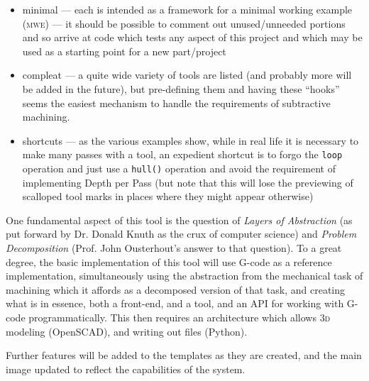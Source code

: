 \documentclass{ltxdoc}
\begin{document}
\begin{itemize}
\item minimal --- each is intended as a framework for a minimal working example (\textsc{mwe}) --- it should be possible to comment out unused/unneeded portions and so arrive at code which tests any aspect of this project and which may be used as a starting point for a new part/project
\item compleat --- a quite wide variety of tools are listed (and probably more will be added in the future), but pre-defining them and having these ``hooks'' seems the easiest mechanism to handle the requirements of subtractive machining. 
\item shortcuts --- as the various examples show, while in real life it is necessary to 
                    make many passes with a tool, an expedient shortcut is to forgo the 
                    \verb|loop| operation and just use a \verb|hull()| operation and avoid the requirement of implementing 
                    Depth per Pass (but note that this will lose the previewing of scalloped tool 
                    marks in places where they might appear otherwise)
\end{itemize}

One fundamental aspect of this tool is the question of \emph{Layers of Abstraction} (as put forward by Dr. Donald Knuth as the crux of computer science) and \emph{Problem Decomposition} (Prof. John Ousterhout's answer to that question). To a great degree, the basic implementation of this tool will use G-code as a reference implementation, simultaneously using the abstraction from the mechanical task of machining which it affords as a decomposed version of that task, and creating what is in essence, both a front-end, and a tool, and an API for working with G-code programmatically. This then requires an architecture which allows \textsc{3d} modeling (OpenSCAD), and writing out files (Python).

Further features will be added to the templates as they are created, and the main image updated to reflect the capabilities of the system.

%
%
%
%
%
\end{document}
